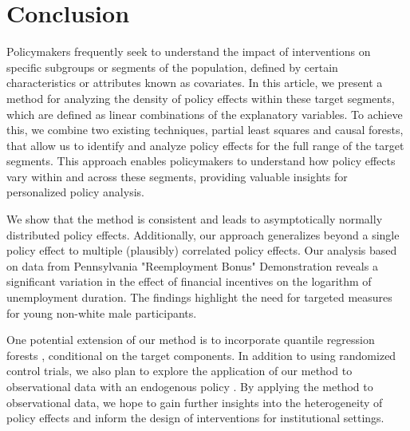 \documentclass[12pt]{article}
\begin{document}
\section{Conclusion}
Policymakers frequently seek to understand the impact of interventions on specific subgroups or segments of the population, defined by certain characteristics or attributes known as covariates. In this article, we present a method for analyzing the density of policy effects within these target segments, which are defined as linear combinations of the explanatory variables. To achieve this, we combine two existing techniques, partial least squares and causal forests, that allow us to identify and analyze policy effects for the full range of the target segments. This approach enables policymakers to understand how policy effects vary within and across these segments, providing valuable insights for personalized policy analysis.


We show that the method is consistent and leads to asymptotically normally distributed policy effects. Additionally, our approach generalizes beyond a single policy effect to multiple (plausibly) correlated policy effects. Our analysis based on data from Pennsylvania "Reemployment Bonus" Demonstration reveals a significant variation in the effect of financial incentives on the logarithm of unemployment duration. The findings highlight the need for targeted measures for young non-white male participants. 

One potential extension of our method is to incorporate quantile regression forests \citep{meinshausen2006quantile}, conditional on the target components. In addition to using randomized control trials, we also plan to explore the application of our method to observational data with an endogenous policy \citep{vella1999estimating, baiocchi2014instrumental}.  By applying the method to observational data, we hope to gain further insights into the heterogeneity of policy effects and inform the design of  interventions for institutional settings.















\appendix
\newpage
{}
\renewcommand{\thesection}{A.\arabic{section}}
\end{document}
